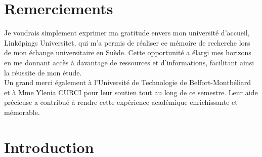 \documentclass[12pt, a4paper]{report}
\begin{document}
\tahomafont

\makeutbmfrontcover{}

\topmargin -1.5cm
\pagestyle{fancy}
\fancyhf{}
\fancyfoot[C]{\thepage}

\renewcommand{\headrulewidth}{1pt}

\chapter*{Remerciements}

Je voudrais simplement exprimer ma gratitude envers mon université d'accueil, Linköpings Universitet, qui m'a permis de réaliser ce mémoire de recherche lors de mon échange universitaire en Suède. Cette opportunité a élargi mes horizons en me donnant accès à davantage de ressources et d'informations, facilitant ainsi la réussite de mon étude.\\

Un grand merci également à l'Université de Technologie de Belfort-Montbéliard et à Mme Ylenia CURCI pour leur soutien tout au long de ce semestre. Leur aide précieuse a contribué à rendre cette expérience académique enrichissante et mémorable.

\tableofcontents

\chapter{Introduction}



\end{document}
